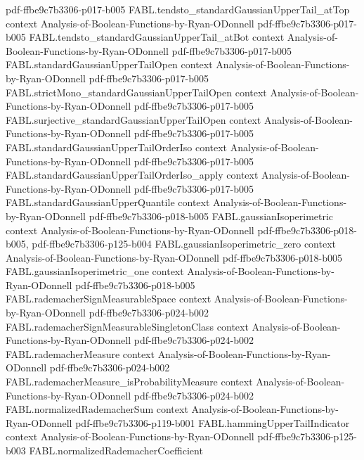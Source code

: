 \begin{theorem}
  {pdf-ffbe9c7b3306-p017-b005}
\proofstep
  {FABL.tendsto_standardGaussianUpperTail_atTop}
  {context}
  {Analysis-of-Boolean-Functions-by-Ryan-ODonnell}
  {pdf-ffbe9c7b3306-p017-b005}
\proofstep
  {FABL.tendsto_standardGaussianUpperTail_atBot}
  {context}
  {Analysis-of-Boolean-Functions-by-Ryan-ODonnell}
  {pdf-ffbe9c7b3306-p017-b005}
\proofstep
  {FABL.standardGaussianUpperTailOpen}
  {context}
  {Analysis-of-Boolean-Functions-by-Ryan-ODonnell}
  {pdf-ffbe9c7b3306-p017-b005}
\proofstep
  {FABL.strictMono_standardGaussianUpperTailOpen}
  {context}
  {Analysis-of-Boolean-Functions-by-Ryan-ODonnell}
  {pdf-ffbe9c7b3306-p017-b005}
\proofstep
  {FABL.surjective_standardGaussianUpperTailOpen}
  {context}
  {Analysis-of-Boolean-Functions-by-Ryan-ODonnell}
  {pdf-ffbe9c7b3306-p017-b005}
\proofstep
  {FABL.standardGaussianUpperTailOrderIso}
  {context}
  {Analysis-of-Boolean-Functions-by-Ryan-ODonnell}
  {pdf-ffbe9c7b3306-p017-b005}
\proofstep
  {FABL.standardGaussianUpperTailOrderIso_apply}
  {context}
  {Analysis-of-Boolean-Functions-by-Ryan-ODonnell}
  {pdf-ffbe9c7b3306-p017-b005}
\proofstep
  {FABL.standardGaussianUpperQuantile}
  {context}
  {Analysis-of-Boolean-Functions-by-Ryan-ODonnell}
  {pdf-ffbe9c7b3306-p018-b005}
\proofstep
  {FABL.gaussianIsoperimetric}
  {context}
  {Analysis-of-Boolean-Functions-by-Ryan-ODonnell}
  {pdf-ffbe9c7b3306-p018-b005,
    pdf-ffbe9c7b3306-p125-b004}
\proofstep
  {FABL.gaussianIsoperimetric_zero}
  {context}
  {Analysis-of-Boolean-Functions-by-Ryan-ODonnell}
  {pdf-ffbe9c7b3306-p018-b005}
\proofstep
  {FABL.gaussianIsoperimetric_one}
  {context}
  {Analysis-of-Boolean-Functions-by-Ryan-ODonnell}
  {pdf-ffbe9c7b3306-p018-b005}
\proofstep
  {FABL.rademacherSignMeasurableSpace}
  {context}
  {Analysis-of-Boolean-Functions-by-Ryan-ODonnell}
  {pdf-ffbe9c7b3306-p024-b002}
\proofstep
  {FABL.rademacherSignMeasurableSingletonClass}
  {context}
  {Analysis-of-Boolean-Functions-by-Ryan-ODonnell}
  {pdf-ffbe9c7b3306-p024-b002}
\proofstep
  {FABL.rademacherMeasure}
  {context}
  {Analysis-of-Boolean-Functions-by-Ryan-ODonnell}
  {pdf-ffbe9c7b3306-p024-b002}
\proofstep
  {FABL.rademacherMeasure_isProbabilityMeasure}
  {context}
  {Analysis-of-Boolean-Functions-by-Ryan-ODonnell}
  {pdf-ffbe9c7b3306-p024-b002}
\proofstep
  {FABL.normalizedRademacherSum}
  {context}
  {Analysis-of-Boolean-Functions-by-Ryan-ODonnell}
  {pdf-ffbe9c7b3306-p119-b001}
\proofstep
  {FABL.hammingUpperTailIndicator}
  {context}
  {Analysis-of-Boolean-Functions-by-Ryan-ODonnell}
  {pdf-ffbe9c7b3306-p125-b003}
\proofstep
  {FABL.normalizedRademacherCoefficient}

\end{theorem}
